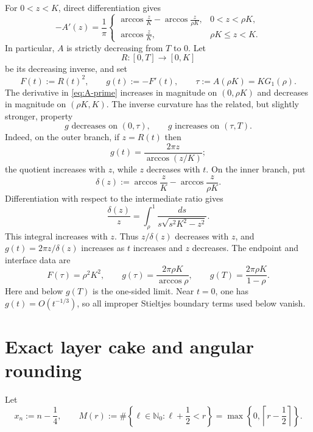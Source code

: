 \documentclass[11pt]{article}
\theoremstyle{remark}
\begin{document}
For $0<z<K$, direct differentiation gives
\begin{equation}
 -A'(z)=\frac1\pi
 \begin{cases}
 \displaystyle
 \arccos\frac zK-\arccos\frac z{\rho K},&0<z<\rho K,\\[6pt]
 \displaystyle \arccos\frac zK,&\rho K\leq z<K.
 \end{cases}
 \label{eq:A-prime}
\end{equation}
In particular, $A$ is strictly decreasing from $T$ to $0$.  Let
\[
 R:[0,T]\longrightarrow[0,K]
\]
be its decreasing inverse, and set
\begin{equation}
 F(t):=R(t)^2,
 \qquad
 g(t):=-F'(t),
 \qquad
 \tau:=A(\rho K)=K G_1(\rho).
 \label{eq:inverse-data}
\end{equation}
The derivative in \eqref{eq:A-prime} increases in magnitude on
$(0,\rho K)$ and decreases in magnitude on $(\rho K,K)$.  The inverse
curvature has the related, but slightly stronger, property
\begin{equation}
 g\text{ decreases on }(0,\tau),
 \qquad
 g\text{ increases on }(\tau,T).
 \label{eq:g-shape}
\end{equation}
Indeed, on the outer branch, if $z=R(t)$ then
\[
 g(t)=\frac{2\pi z}{\arccos(z/K)};
\]
the quotient increases with $z$, while $z$ decreases with $t$.  On the
inner branch, put
\[
 \delta(z):=\arccos\frac zK-\arccos\frac z{\rho K}.
\]
Differentiation with respect to the intermediate ratio gives
\[
 \frac{\delta(z)}z
 =\int_\rho^1\frac{ds}{s\sqrt{s^2K^2-z^2}}.
\]
This integral increases with $z$.  Thus $z/\delta(z)$ decreases with
$z$, and $g(t)=2\pi z/\delta(z)$ increases as $t$ increases and $z$
decreases.
The endpoint and interface data are
\begin{equation}
 F(\tau)=\rho^2K^2,
 \qquad
 g(\tau)=\frac{2\pi\rho K}{\arccos\rho},
 \qquad
 g(T)=\frac{2\pi\rho K}{1-\rho}.
 \label{eq:g-data}
\end{equation}
Here and below $g(T)$ is the one-sided limit.  Near $t=0$, one has
$g(t)=O(t^{-1/3})$, so all improper Stieltjes boundary terms used below
vanish.

\section{Exact layer cake and angular rounding}

Let
\begin{equation}
 x_n:=n-\frac14,
 \qquad
 M(r):=\#\left\{\ell\in\mathbb N_0:\ell+\frac12<r\right\}
       =\max\left\{0,\left\lceil r-\frac12\right\rceil\right\}.
 \label{eq:shifted-grids}
\end{equation}
\end{document}
